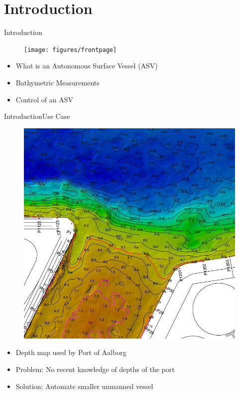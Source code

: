 \section{Introduction}

\begin{frame}{Introduction}{}
    \begin{figure}[H]
        \centering
        \texttt{[image: figures/frontpage]}
    \end{figure}
    \begin{itemize}
         \item What is an Autonomous Surface Vessel (ASV)
         \item Bathymetric Measurements
         \item Control of an ASV
    \end{itemize}
\end{frame}

\begin{frame}{Introduction}{Use Case}
    \begin{figure}[H]
        \centering
        \includegraphics[width=.4\linewidth]{figures/smallDebthMapAalborg}
    \end{figure}
    \begin{itemize}
        \item Depth map used by Port of Aalborg 
        \item Problem: No recent knowledge of depths of the port
        \item Solution: Automate smaller unmanned vessel
    \end{itemize}
\end{frame}

